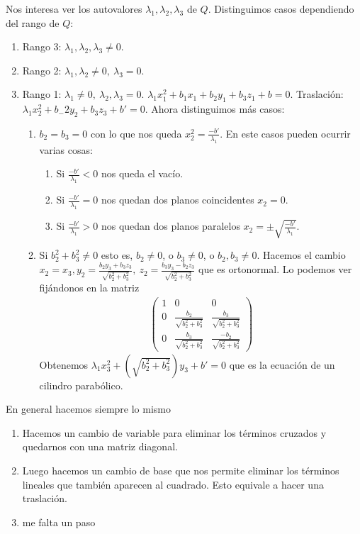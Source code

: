 \documentclass[14pt]{book}
\begin{document}
Nos interesa ver los autovalores $\lambda_1, \lambda_2, \lambda_3$ de $Q$. Distinguimos casos dependiendo del rango de $Q$:
\begin{enumerate}
	\item Rango 3: $\lambda_1, \lambda_2, \lambda_3 ≠ 0$.
	\item Rango 2: $\lambda_1, \lambda_2 ≠ 0,\ \lambda_3 = 0$.
	\item Rango 1: $\lambda_1 ≠ 0,\ \lambda_2, \lambda_3 = 0$. $\lambda_1x_1^2 + b_1x_1 + b_2y_1 + b_3z_1 + b = 0$. Traslación: $\lambda_1x_2^2 + b_-2y_2 + b_3z_3 + b' = 0$. Ahora distinguimos más casos:
	\begin{enumerate}
		\item $b_2 = b_3 = 0$ con lo que nos queda $x_2^2 = \frac{-b'}{\lambda_1}$. En este casos pueden ocurrir varias cosas:
		\begin{enumerate}
			\item Si $\frac{-b'}{\lambda_1} < 0$ nos queda el vacío.
			\item Si $\frac{-b'}{\lambda_1} = 0$ nos quedan dos planos coincidentes $x_2 = 0$.
			\item Si $\frac{-b'}{\lambda_1} > 0$ nos quedan dos planos paralelos $x_2 = \pm \sqrt{\frac{-b'}{\lambda_1}}$.
		\end{enumerate}
		\item Si $b_2^2 + b_3^2 ≠ 0$ esto es, $b_2 ≠ 0$, o $b_3 ≠ 0$, o $b_2, b_3 ≠ 0$. Hacemos el cambio $x_2= x_3, y_2 = \frac{b_2y_3 + b_3z_3}{\sqrt{b_2^2 + b_3^2}},\ z_2 = \frac{b_3y_3 - b_2z_3}{\sqrt{b_2^2 + b_3^2}}$ que es ortonormal. Lo podemos ver fijándonos en la matriz
		\begin{align}
			\left(\begin{array}{ccc}
			1 & 0 & 0 \\
			0 & \frac{b_2}{\sqrt{b_2^2 + b_3^2}} & \frac{b_3}{\sqrt{b_2^2 + b_3^2}} \\
			0 & \frac{b_3}{\sqrt{b_2^2 + b_3^2}} & \frac{- b_2}{\sqrt{b_2^2 + b_3^2}}
			\end{array}\right)
		\end{align}
		Obtenemos $\lambda_1x_3^2 + \left(\sqrt{b_2^2 + b_3^2}\right)y_3 + b' = 0$ que es la ecuación de un cilindro parabólico.
	\end{enumerate}
\end{enumerate}

En general hacemos siempre lo mismo
\begin{enumerate}
	\item Hacemos un cambio de variable para eliminar los términos cruzados y quedarnos con una matriz diagonal.
	\item Luego hacemos un cambio de base que nos permite eliminar los términos lineales que también aparecen al cuadrado. Esto equivale a hacer una traslación.
	\item me falta un paso
\end{enumerate}
\end{document}
